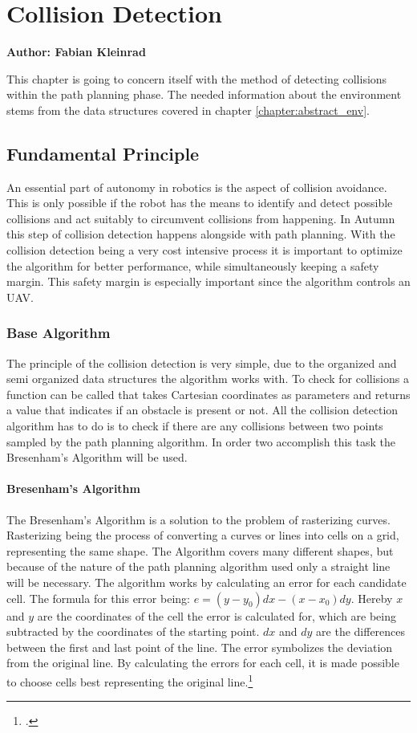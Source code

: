 \chapter{Collision Detection}
\label{chapter:collision_detection}

\textbf{Author: Fabian Kleinrad} 

This chapter is going to concern itself with the method of detecting collisions within the path planning phase. The needed information about the environment stems from the data structures covered in chapter \ref{chapter:abstract_env}. 

\section{Fundamental Principle}
An essential part of autonomy in robotics is the aspect of collision avoidance. This is only possible if the robot has the means to identify and detect possible collisions and act suitably to circumvent collisions from happening.\newline
In Autumn this step of collision detection happens alongside with path planning. With the collision detection being a very cost intensive process it is important to optimize the algorithm for better performance, while simultaneously keeping a safety margin. This safety margin is especially important since the algorithm controls an UAV. 

\subsection{Base Algorithm}
The principle of the collision detection is very simple, due to the organized and semi organized data structures the algorithm works with. To check for collisions a function can be called that takes Cartesian coordinates as parameters and returns a value that indicates if an obstacle is present or not. All the collision detection algorithm has to do is to check if there are any collisions between two points sampled by the path planning algorithm. In order two accomplish this task the Bresenham's Algorithm will be used.\newline

\subsubsection{Bresenham's Algorithm} 
The Bresenham's Algorithm is a solution to the problem of rasterizing curves. Rasterizing being the process of converting a curves or lines into cells on a grid, representing the same shape. The Algorithm covers many different shapes, but because of the nature of the path planning algorithm used only a straight line will be necessary.
The algorithm works by calculating an error for each candidate cell. The formula for this error being: $e=(y-y_0)dx-(x-x_0)dy$. Hereby $x$ and $y$ are the coordinates of the cell the error is calculated for, which are being subtracted by the coordinates of the starting point. $dx$ and $dy$ are the differences between the first and last point of the line.
The error symbolizes the deviation from the original line. By calculating the errors for each cell, it is made possible to choose cells best representing the original line.\footcite{Zingl2012}

